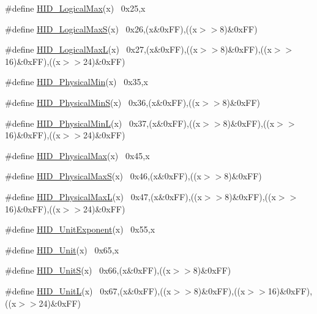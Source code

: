 \begin{DoxyCompactItemize}
\item 
\#define \hyperlink{group__USBD__HID_gae254480a3aefff2eff5544955ae6e925}{H\+I\+D\+\_\+\+Logical\+Max}(x)        ~0x25,x
\item 
\#define \hyperlink{group__USBD__HID_ga678b8b7f7941fb80183945281f437fd4}{H\+I\+D\+\_\+\+Logical\+MaxS}(x)      ~0x26,(x\&0x\+F\+F),((x$>$$>$8)\&0x\+F\+F)
\item 
\#define \hyperlink{group__USBD__HID_ga7dd6f35774e40ce62586942d6b8e5414}{H\+I\+D\+\_\+\+Logical\+MaxL}(x)      ~0x27,(x\&0x\+F\+F),((x$>$$>$8)\&0x\+F\+F),((x$>$$>$16)\&0x\+F\+F),((x$>$$>$24)\&0x\+F\+F)
\item 
\#define \hyperlink{group__USBD__HID_ga7fc1d62e0f6da232740bad66fd8cdd65}{H\+I\+D\+\_\+\+Physical\+Min}(x)      ~0x35,x
\item 
\#define \hyperlink{group__USBD__HID_ga3935a4298b7f791d832ecae83aca0136}{H\+I\+D\+\_\+\+Physical\+MinS}(x)    ~0x36,(x\&0x\+F\+F),((x$>$$>$8)\&0x\+F\+F)
\item 
\#define \hyperlink{group__USBD__HID_gaaaecd1b3009cde0d97f8562357a16af4}{H\+I\+D\+\_\+\+Physical\+MinL}(x)    ~0x37,(x\&0x\+F\+F),((x$>$$>$8)\&0x\+F\+F),((x$>$$>$16)\&0x\+F\+F),((x$>$$>$24)\&0x\+F\+F)
\item 
\#define \hyperlink{group__USBD__HID_ga0f108ec17d5b80aa9bf392d9ee080baf}{H\+I\+D\+\_\+\+Physical\+Max}(x)      ~0x45,x
\item 
\#define \hyperlink{group__USBD__HID_ga74c9d68e790bee19901a7e12fcd727f8}{H\+I\+D\+\_\+\+Physical\+MaxS}(x)    ~0x46,(x\&0x\+F\+F),((x$>$$>$8)\&0x\+F\+F)
\item 
\#define \hyperlink{group__USBD__HID_gabe373fe0beec170501a5ff0d3b08dac2}{H\+I\+D\+\_\+\+Physical\+MaxL}(x)    ~0x47,(x\&0x\+F\+F),((x$>$$>$8)\&0x\+F\+F),((x$>$$>$16)\&0x\+F\+F),((x$>$$>$24)\&0x\+F\+F)
\item 
\#define \hyperlink{group__USBD__HID_gaee604ebd3f4140e38363e0605934182a}{H\+I\+D\+\_\+\+Unit\+Exponent}(x)    ~0x55,x
\item 
\#define \hyperlink{group__USBD__HID_ga98efb0aebc0fb6cf5020451b9001fbe6}{H\+I\+D\+\_\+\+Unit}(x)                    ~0x65,x
\item 
\#define \hyperlink{group__USBD__HID_ga8ace3b1cd19af203ef27f5779b00a7be}{H\+I\+D\+\_\+\+UnitS}(x)                  ~0x66,(x\&0x\+F\+F),((x$>$$>$8)\&0x\+F\+F)
\item 
\#define \hyperlink{group__USBD__HID_gaef5e6a11738ca876104925724cecbaed}{H\+I\+D\+\_\+\+UnitL}(x)                  ~0x67,(x\&0x\+F\+F),((x$>$$>$8)\&0x\+F\+F),((x$>$$>$16)\&0x\+F\+F),((x$>$$>$24)\&0x\+F\+F)

\end{DoxyCompactItemize}
